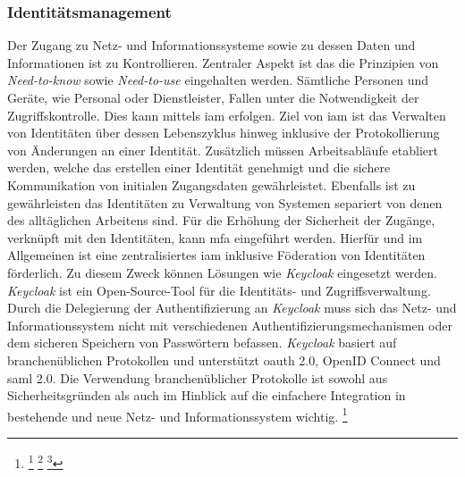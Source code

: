 \documentclass[11pt,a4paper,hidelinks]{article}   %
\begin{document}
            \subsubsection{Identitätsmanagement}
            Der Zugang zu Netz- und Informationssysteme sowie zu dessen Daten und Informationen ist zu Kontrollieren. Zentraler Aspekt ist das die Prinzipien von \emph{Need-to-know} sowie \emph{Need-to-use} eingehalten werden. Sämtliche Personen und Geräte, wie Personal oder Dienstleister, Fallen unter die Notwendigkeit der Zugriffskontrolle. Dies kann mittels \gls{iam} erfolgen. Ziel von \gls{iam} ist das Verwalten von Identitäten über dessen Lebenszyklus hinweg inklusive der Protokollierung von Änderungen an einer Identität. Zusätzlich müssen Arbeitsabläufe etabliert werden, welche das erstellen einer Identität genehmigt und die sichere Kommunikation von initialen Zugangsdaten gewährleistet. Ebenfalls ist zu gewährleisten das Identitäten zu Verwaltung von Systemen separiert von denen des alltäglichen Arbeitens sind. Für die Erhöhung der Sicherheit der Zugänge, verknüpft mit den Identitäten, kann \gls{mfa} eingeführt werden. Hierfür und im Allgemeinen ist eine zentralisiertes \gls{iam} inklusive Föderation von Identitäten förderlich. Zu diesem Zweck können Lösungen wie \emph{Keycloak} eingesetzt werden. \emph{Keycloak} ist ein Open-Source-Tool für die Identitäts- und Zugriffsverwaltung. Durch die Delegierung der Authentifizierung an \emph{Keycloak} muss sich das Netz- und Informationssystem nicht mit verschiedenen Authentifizierungsmechanismen oder dem sicheren Speichern von Passwörtern befassen. \emph{Keycloak} basiert auf branchenüblichen Protokollen und unterstützt \gls{oauth} 2.0, OpenID Connect und \gls{saml} 2.0. Die Verwendung branchenüblicher Protokolle ist sowohl aus Sicherheitsgründen als auch im Hinblick auf die einfachere Integration in bestehende und neue Netz- und Informationssystem wichtig.
            \footnote{
                \footcite[Vgl.][, S. 3 - 6 \& 13 - 15]{9781836797661} %
                \footcite[Vgl.][, S. 150 \& 173 - 180]{9789811926570}
                \footcite[Vgl.][, S. 4 - 5, 187, 197 \& 203 - 204]{9781800562493}
            }
\end{document}
